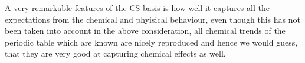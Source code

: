 A very remarkable features of the CS basis is how well it captures all the expectations
from the chemical and phyisical behaviour, even though this has not been taken
into account in the above consideration, all chemical trends of the
periodic table which are known are nicely reproduced and hence
we would guess, that they are very good at capturing chemical effects as well.


